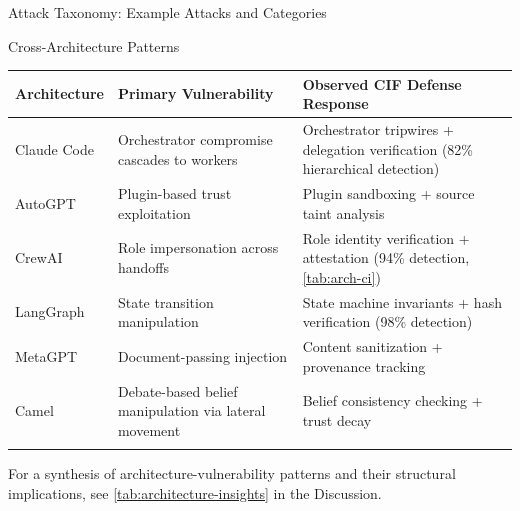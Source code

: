 \documentclass[
  ignorenonframetext,
]{beamer}
\newcounter{none} %
\begin{document}
\begin{frame}{Attack Taxonomy: Example Attacks and Categories}
\begin{block}{Cross-Architecture Patterns}
{\def\LTcaptype{none} %
\begin{longtable}[]{@{}
  >{\raggedright\arraybackslash}p{}
  >{\raggedright\arraybackslash}p{}
  >{\raggedright\arraybackslash}p{}@{}}
\toprule\noalign{}
\begin{minipage}[b]{\linewidth}\raggedright
Architecture
\end{minipage} & \begin{minipage}[b]{\linewidth}\raggedright
Primary Vulnerability
\end{minipage} & \begin{minipage}[b]{\linewidth}\raggedright
Observed CIF Defense Response
\end{minipage} \\
\midrule\noalign{}
\endhead
Claude Code & Orchestrator compromise cascades to workers & Orchestrator
tripwires + delegation verification (82\% hierarchical detection) \\
AutoGPT & Plugin-based trust exploitation & Plugin sandboxing + source
taint analysis \\
CrewAI & Role impersonation across handoffs & Role identity verification
+ attestation (94\% detection, \cref{tab:arch-ci}) \\
LangGraph & State transition manipulation & State machine invariants +
hash verification (98\% detection) \\
MetaGPT & Document-passing injection & Content sanitization + provenance
tracking \\
Camel & Debate-based belief manipulation via lateral movement & Belief
consistency checking + trust decay \\
\bottomrule\noalign{}
\end{longtable}
}

For a synthesis of architecture-vulnerability patterns and their
structural implications, see \cref{tab:architecture-insights} in the
Discussion.
\end{block}
\end{frame}
\end{document}
